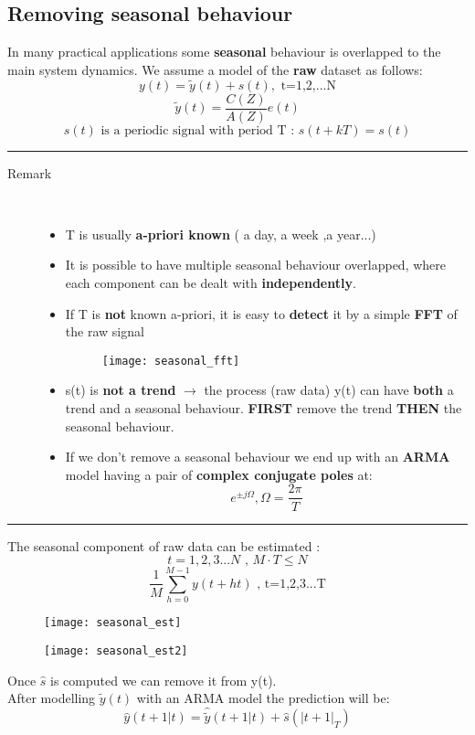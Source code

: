 \subsection{Removing seasonal behaviour}
In many practical applications some \textbf{seasonal} behaviour is overlapped to the main system dynamics. We assume a model of the \textbf{raw} dataset as follows:
$$ y(t) = \tilde{y}(t) + s(t) ,\text{ t=1,2,...N}$$
$$ \tilde{y}(t) = \frac{C(Z)}{A(Z)}e(t)$$
$$ s(t) \text{ is a periodic signal with period T : } s(t+kT)=s(t)$$
\par\noindent\rule{\textwidth}{0.4pt}
\begin{description}
\item [Remark]\hfill\\
\begin{itemize}
\item T is usually \textbf{a-priori known} ( a day, a week ,a year...)
\item It is possible to have multiple seasonal behaviour overlapped, where each component can be dealt with \textbf{independently}.
\item If T is \textbf{not} known a-priori, it is easy to \textbf{detect} it by a simple \textbf{FFT} of the raw signal
\begin{figure}[H]
 \centering
  \texttt{[image: seasonal\_fft]}
\end{figure}
\item s(t) is \textbf{not a trend} $\to$  the process (raw data) y(t) can have \textbf{both} a trend and a seasonal behaviour. \textbf{FIRST} remove the trend \textbf{THEN} the seasonal behaviour.
\item If we don't remove a seasonal behaviour we end up with an \textbf{ARMA} model having a pair of \textbf{complex conjugate poles} at:
$$ e^{\pm j\Omega} , \Omega =\frac{2\pi}{T}$$  
\end{itemize}
\end{description}
\par\noindent\rule{\textwidth}{0.4pt}
The seasonal component of raw data can be estimated :
$$ t=1,2,3...N \text{  ,  } M\cdot T \leq N$$
\[
\boxed{\frac{1}{M}\sum\limits_{h=0}^{M-1}y(t+ht) \text{  , t=1,2,3...T}}
\]
\begin{figure}[H]
 \centering
  \texttt{[image: seasonal\_est]}
\end{figure}
\begin{figure}[H]
 \centering
  \texttt{[image: seasonal\_est2]}
\end{figure}
Once $\hat{s}$ is computed we can remove it from y(t).\\
After modelling $\tilde{y}(t)$ with an ARMA model the prediction will be:
\[
\boxed{\hat{y}(t+1|t) = \hat{\tilde{y}}(t+1|t) + \hat{s}(|t+1|_T)}
\]

